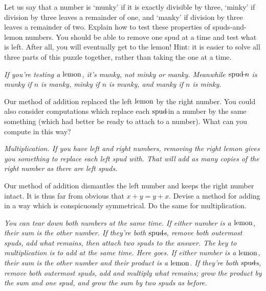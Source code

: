 \documentclass{book}
\begin{document}
\begin{sol}
  Let us say that a number is `munky' if it is exactly divisible by three, `minky' if division by three leaves a remainder of one, and `manky' if division by three leaves a remainder of two. Explain how to test these properties of spuds-and-lemon numbers. You should be able to remove one spud at a time and test what is left. After all, you will eventually get to the lemon! Hint: it is easier to solve all three parts of this puzzle together, rather than taking the one at a time.

  \emph{If you're testing a $\mbox{lemon}$, it's munky, not minky or manky. Meanwhile $\mbox{spud}\!\!\!-\!\!\! n$ is munky if $n$ is manky, minky if $n$ is munky, and manky if $n$ is minky.}
\end{sol}


\begin{sol}
  Our method of addition replaced the left $\mbox{lemon}$ by the right number. You could also consider computations which replace each $\mbox{spud}\!\!\!-\!\!\!$ in a number by the same something (which had better be ready to attach to a number). What can you compute in this way?

  \emph{Multiplication. If you have left and right numbers, removing the right lemon gives you something to replace each left spud with. That will add as many copies of the right number as there are left spuds. }
\end{sol}


\begin{sol}
  Our method of addition dismantles the left number and keeps the right number intact. It is thus far from obvious that $x+y = y+x$. Devise a method for adding in a way which is conspicuously symmetrical. Do the same for multiplication.

  \emph{You can tear down both numbers at the same time. If either number is a $\mbox{lemon}$, their sum is the other number. If they're both $\mbox{spud}\!\!\!-\!\!\!\,$s, remove both outermost spuds, add what remains, then attach two spuds to the answer. The key to multiplication is to add at the same time. Here goes. If either number is a $\mbox{lemon}$, their sum is the other number and their product is a $\mbox{lemon}$. If they're both $\mbox{spud}\!\!\!-\!\!\!\,$s, remove both outermost spuds, add and multiply what remains; grow the product by the sum and one spud, and grow the sum by two spuds as before.}
\end{sol}
\end{document}
